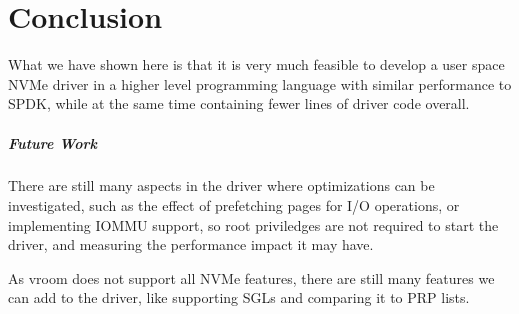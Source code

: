 \chapter{Conclusion}\label{c:c}
What we have shown here is that it is very much feasible to develop a user space NVMe driver in a higher level programming language with similar performance to SPDK, while at the same time containing fewer lines of driver code overall.

\paragraph{Future Work}
There are still many aspects in the driver where optimizations can be investigated, such as the effect of prefetching pages for I/O operations, or implementing IOMMU support, so root priviledges are not required to start the driver, and measuring the performance impact it may have.

As vroom does not support all NVMe features, there are still many features we can add to the driver, like supporting SGLs and comparing it to PRP lists.
